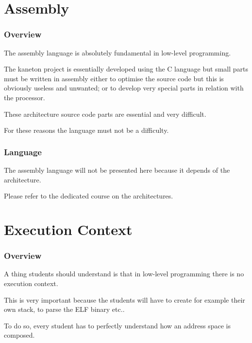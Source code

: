 %
%

\section{Assembly}


\begin{frame}
  \frametitle{Overview}

  The assembly language is absolutely fundamental in low-level programming.

  \nl

  The kaneton project is essentially developed using the C language but
  small parts must be written in assembly either to optimise the source
  code but this is obviously useless and unwanted; or to develop very
  special parts in relation with the processor.

  \nl

  These architecture source code parts are essential and very difficult.

  \nl

  For these reasons the language must not be a difficulty.
\end{frame}


\begin{frame}
  \frametitle{Language}

  The assembly language will not be presented here because it depends
  of the architecture.

  \nl

  Please refer to the dedicated course on the architectures.
\end{frame}

%
%

\section{Execution Context}


\begin{frame}
  \frametitle{Overview}

  A thing students should understand is that in low-level programming
  there is no execution context.

  \nl

  This is very important because the students will have to create for
  example their own stack, to parse the ELF binary etc..

  \nl

  To do so, every student has to perfectly understand how an address
  space is composed.
\end{frame}

